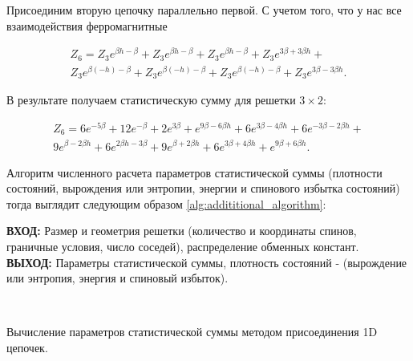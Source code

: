 \documentclass[utf8, babel, sor, jor, amsmath, amssymb, reprint]{elsarticle} %
\begin{document}
Присоединим вторую цепочку параллельно первой. С учетом того, что у нас все взаимодействия ферромагнитные

\begin{equation}
	\label{eq:stat_3_un}
	\begin{alignedat}{2}
		Z_6 = Z_3 e^{\beta  h-\beta }+Z_3 e^{\beta  h-\beta }+Z_3 e^{\beta  h-\beta }+Z_3 e^{3 \beta +3 \beta  h}+ \\
		Z_3 e^{\beta  (-h)-\beta }+Z_3 e^{\beta  (-h)-\beta }+Z_3 e^{\beta  (-h)-\beta }+Z_3 e^{3 \beta -3 \beta  h}.
	\end{alignedat}
\end{equation}

В результате получаем статистическую сумму для решетки $3 \times 2$:

\begin{equation}
	\label{eq:stat_3_res}
	\begin{alignedat}{2}
		Z_6 = 6 e^{-5 \beta }+12 e^{-\beta }+2 e^{3 \beta }+e^{9 \beta -6 \beta  h}+6 e^{3 \beta -4 \beta  h}+6 e^{-3 \beta -2 \beta  h}+\\
		9 e^{\beta -2 \beta  h}+6 e^{2 \beta  h-3 \beta }+9 e^{\beta +2 \beta  h}+6 e^{3 \beta +4 \beta  h}+e^{9 \beta +6 \beta  h}.
	\end{alignedat}
\end{equation}

Алгоритм численного расчета  параметров статистической суммы (плотности состояний, вырождения или энтропии, энергии и спинового избытка состояний) тогда выглядит следующим образом \ref{alg:addititional_algorithm}:


\begin{algorithm}[H]
	\textbf{ВХОД:} Размер и геометрия решетки (количество и координаты спинов, граничные условия, число соседей), распределение обменных констант.\\
	\textbf{ВЫХОД:} Параметры статистической суммы, плотность состояний - (вырождение или энтропия, энергия и спиновый избыток).
	\begin{algorithmic}
		{
			{
			}
			\ENDFOR\\
		}
		\ENDFOR
	\end{algorithmic}
	\caption{Вычисление параметров статистической суммы методом присоединения 1D цепочек.}
	\label{alg:addititional_algorithm}
\end{algorithm}
\end{document}
